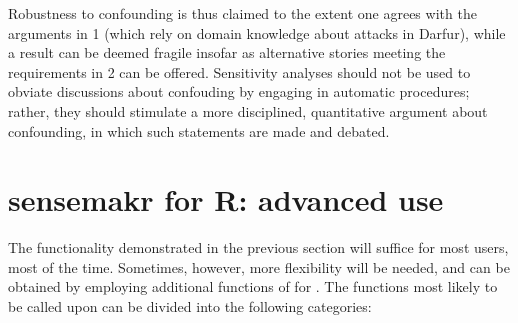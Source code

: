 \documentclass[
]{jss}
\begin{document}
Robustness to confounding is thus claimed to the extent one agrees with
the arguments in 1 (which rely on domain knowledge about attacks in
Darfur), while a result can be deemed fragile insofar as alternative
stories meeting the requirements in 2 can be offered. Sensitivity
analyses should not be used to obviate discussions about confouding by
engaging in automatic procedures; rather, they should stimulate a more
disciplined, quantitative argument about confounding, in which such
statements are made and debated.

\hypertarget{r-adv}{%
\section{sensemakr for R: advanced use}\label{r-adv}}

The functionality demonstrated in the previous section will suffice for
most users, most of the time. Sometimes, however, more flexibility will
be needed, and can be obtained by employing additional functions of
 for . The functions most likely to be called
upon can be divided into the following categories:
\end{document}
